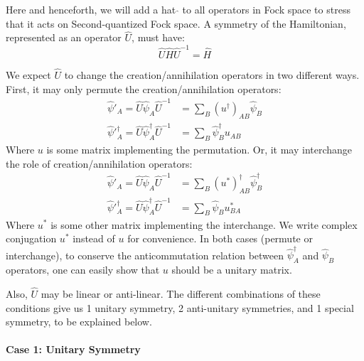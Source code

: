 Here and henceforth, we will add a hat $\hat{}$ to all operators in Fock space
to stress that it acts on Second-quantized Fock space.  A symmetry of the
Hamiltonian, represented as an operator $\hat{U}$, must have:
\begin{equation}
\label{eq:sym-in-2nd-1}
\hat{U}\hat{H}\hat{U}^{-1} = \hat{H}
\end{equation}

We expect $\hat{U}$ to change the creation/annihilation operators in two different
ways. First, it may only permute the creation/annihilation operators:
\begin{subequations}
	\label{eq:sym-in-2nd-permute}
	\begin{align}
	\label{eq:sym-in-2nd-permute-1}
	\hat{\psi}'_A = 
	\hat{U} \hat\psi_A \hat{U}^{-1} &=
	\sum_B (u^\dagger)_{AB} \hat\psi_B \\
	\label{eq:sym-in-2nd-permute-2}
	\hat\psi'^\dagger_A =
	\hat{U} \hat\psi^\dagger_A \hat{U}^{-1} &= 
	\sum_B  \hat\psi^\dagger_B u_{AB}
	\end{align}
\end{subequations}
Where $u$ is some matrix implementing the permutation.
Or, it may interchange the role of creation/annihilation operators:
\begin{subequations}
	\label{eq:sym-cc}
	\begin{align}
	\label{eq:sym-cc-1}
	\hat{\psi}'_A = 
	\hat{U} \hat\psi_A \hat{U}^{-1} &=
	\sum_B (u^*)^\dagger_{AB} \hat\psi^\dagger_B \\
	\label{eq:sym-cc-2}
	\hat\psi'^\dagger_A =
	\hat{U} \hat\psi^\dagger_A \hat{U}^{-1} &= 
	\sum_B  \hat\psi_B u^*_{BA}
	\end{align}
\end{subequations}
Where $u^*$ is some other matrix implementing the interchange. We write complex
conjugation $u^*$ instead of $u$ for convenience. In both cases (permute or
interchange), to conserve the anticommutation relation between
$\hat\psi^\dagger_A$ and $\hat\psi_B$ operators, one can easily show that $u$
should be a unitary matrix.

Also, $\hat{U}$ may be linear or anti-linear. The different combinations of these
conditions give us 1 unitary symmetry, 2 anti-unitary symmetries, and 1 special
symmetry, to be explained below.

\paragraph{Case 1: Unitary Symmetry}

